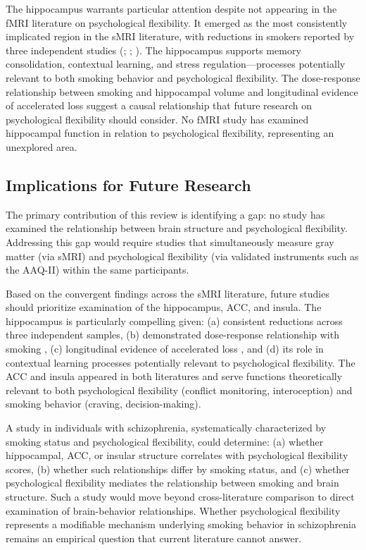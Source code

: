 \documentclass[12pt]{article}
\begin{document}
The hippocampus warrants particular attention despite not appearing in the fMRI literature on psychological flexibility. It emerged as the most consistently implicated region in the sMRI literature, with reductions in smokers reported by three independent studies (\citealt{schneider2014}; \citealt{qiu2024}; \citealt{musket2026}). The hippocampus supports memory consolidation, contextual learning, and stress regulation---processes potentially relevant to both smoking behavior and psychological flexibility. The dose-response relationship between smoking and hippocampal volume \citep{musket2026} and longitudinal evidence of accelerated loss \citep{vanharen2010} suggest a causal relationship that future research on psychological flexibility should consider. No fMRI study has examined hippocampal function in relation to psychological flexibility, representing an unexplored area.

\subsection{Implications for Future Research}

The primary contribution of this review is identifying a gap: no study has examined the relationship between brain structure and psychological flexibility. Addressing this gap would require studies that simultaneously measure gray matter (via sMRI) and psychological flexibility (via validated instruments such as the AAQ-II) within the same participants.

Based on the convergent findings across the sMRI literature, future studies should prioritize examination of the hippocampus, ACC, and insula. The hippocampus is particularly compelling given: (a) consistent reductions across three independent samples, (b) demonstrated dose-response relationship with smoking \citep{musket2026}, (c) longitudinal evidence of accelerated loss \citep{vanharen2010}, and (d) its role in contextual learning processes potentially relevant to psychological flexibility. The ACC and insula appeared in both literatures and serve functions theoretically relevant to both psychological flexibility (conflict monitoring, interoception) and smoking behavior (craving, decision-making).

A study in individuals with schizophrenia, systematically characterized by smoking status and psychological flexibility, could determine: (a) whether hippocampal, ACC, or insular structure correlates with psychological flexibility scores, (b) whether such relationships differ by smoking status, and (c) whether psychological flexibility mediates the relationship between smoking and brain structure. Such a study would move beyond cross-literature comparison to direct examination of brain-behavior relationships. Whether psychological flexibility represents a modifiable mechanism underlying smoking behavior in schizophrenia remains an empirical question that current literature cannot answer.
\end{document}
